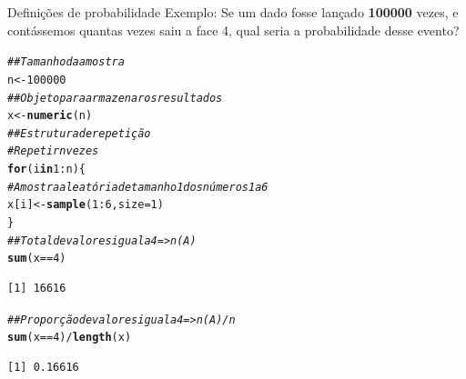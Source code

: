 \documentclass[10pt]{beamer}\usepackage[]{graphicx}\usepackage[]{color}
\makeatletter
\newcommand{\hlnum}[1]{\textcolor[rgb]{0.686,0.059,0.569}{#1}}%
\newcommand{\hlcom}[1]{\textcolor[rgb]{0.678,0.584,0.686}{\textit{#1}}}%
\newcommand{\hlopt}[1]{\textcolor[rgb]{0,0,0}{#1}}%
\newcommand{\hlstd}[1]{\textcolor[rgb]{0.345,0.345,0.345}{#1}}%
\newcommand{\hlkwa}[1]{\textcolor[rgb]{0.161,0.373,0.58}{\textbf{#1}}}%
\newcommand{\hlkwb}[1]{\textcolor[rgb]{0.69,0.353,0.396}{#1}}%
\newcommand{\hlkwc}[1]{\textcolor[rgb]{0.333,0.667,0.333}{#1}}%
\newcommand{\hlkwd}[1]{\textcolor[rgb]{0.737,0.353,0.396}{\textbf{#1}}}%
\newenvironment{kframe}{%
 \def\at@end@of@kframe{}%
 \ifinner\ifhmode%
  \def\at@end@of@kframe{\end{minipage}}%
  \begin{minipage}{\columnwidth}%
 \fi\fi%
 \def\FrameCommand##1{\hskip\@totalleftmargin \hskip-\fboxsep
 \colorbox{shadecolor}{##1}\hskip-\fboxsep
     \hskip-\linewidth \hskip-\@totalleftmargin \hskip\columnwidth}%
 \MakeFramed {\advance\hsize-\width
   \@totalleftmargin\z@ \linewidth\hsize
   \@setminipage}}%
 {\par\unskip\endMakeFramed%
 \at@end@of@kframe}
\newenvironment{knitrout}{}{} %
\theoremstyle{definition}
\makeatother
\begin{document}
\begin{frame}[fragile]{Definições de probabilidade}
  Exemplo: Se um dado fosse lançado \textbf{100000} vezes, e contássemos
  quantas vezes saiu a face 4, qual seria a probabilidade desse evento?
\begin{knitrout}\footnotesize
{}\color{fgcolor}\begin{kframe}
\begin{alltt}
\hlcom{## Tamanho da amostra}
\hlstd{n} \hlkwb{<-} \hlnum{100000}
\hlcom{## Objeto para armazenar os resultados}
\hlstd{x} \hlkwb{<-} \hlkwd{numeric}\hlstd{(n)}
\hlcom{## Estrutura de repetição}
\hlcom{# Repetir n vezes}
\hlkwa{for}\hlstd{(i} \hlkwa{in} \hlnum{1}\hlopt{:}\hlstd{n)\{}
    \hlcom{# Amostra aleatória de tamanho 1 dos números 1 a 6}
    \hlstd{x[i]} \hlkwb{<-} \hlkwd{sample}\hlstd{(}\hlnum{1}\hlopt{:}\hlnum{6}\hlstd{,} \hlkwc{size} \hlstd{=} \hlnum{1}\hlstd{)}
\hlstd{\}}
\hlcom{## Total de valores igual a 4 => n(A)}
\hlkwd{sum}\hlstd{(x} \hlopt{==} \hlnum{4}\hlstd{)}
\end{alltt}
\begin{verbatim}
[1] 16616
\end{verbatim}
\begin{alltt}
\hlcom{## Proporção de valores igual a 4 => n(A)/n}
\hlkwd{sum}\hlstd{(x} \hlopt{==} \hlnum{4}\hlstd{)}\hlopt{/}\hlkwd{length}\hlstd{(x)}
\end{alltt}
\begin{verbatim}
[1] 0.16616
\end{verbatim}
\end{kframe}
\end{knitrout}
\end{frame}
\end{document}

